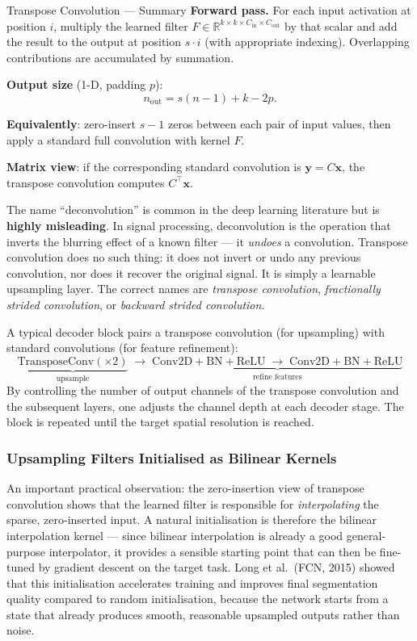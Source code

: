 \documentclass[11pt,a4paper]{article}
\begin{document}
\begin{defbox}{Transpose Convolution — Summary}
\textbf{Forward pass.} For each input activation at position $i$, multiply the learned filter $F \in \mathbb{R}^{k \times k \times C_\text{in} \times C_\text{out}}$ by that scalar and add the result to the output at position $s \cdot i$ (with appropriate indexing). Overlapping contributions are accumulated by summation.

\textbf{Output size} (1-D, padding $p$):
\[
  n_\text{out} = s(n-1) + k - 2p.
\]

\textbf{Equivalently}: zero-insert $s-1$ zeros between each pair of input values, then apply a standard full convolution with kernel $F$.

\textbf{Matrix view}: if the corresponding standard convolution is $\mathbf{y}=C\mathbf{x}$, the transpose convolution computes $C^\top\mathbf{x}$.
\end{defbox}

\begin{notebox}
The name ``deconvolution'' is common in the deep learning literature but is \textbf{highly misleading}. In signal processing, deconvolution is the operation that inverts the blurring effect of a known filter — it \emph{undoes} a convolution. Transpose convolution does no such thing: it does not invert or undo any previous convolution, nor does it recover the original signal. It is simply a learnable upsampling layer. The correct names are \emph{transpose convolution}, \emph{fractionally strided convolution}, or \emph{backward strided convolution}.
\end{notebox}

A typical decoder block pairs a transpose convolution (for upsampling) with standard convolutions (for feature refinement):
\[
  \underbrace{\text{TransposeConv}({\times}2)}_{\text{upsample}} \;\to\; \underbrace{\text{Conv2D} + \text{BN} + \text{ReLU} \;\to\; \text{Conv2D} + \text{BN} + \text{ReLU}}_{\text{refine features}}
\]
By controlling the number of output channels of the transpose convolution and the subsequent layers, one adjusts the channel depth at each decoder stage. The block is repeated until the target spatial resolution is reached.

\subsubsection{Upsampling Filters Initialised as Bilinear Kernels}

An important practical observation: the zero-insertion view of transpose convolution shows that the learned filter is responsible for \emph{interpolating} the sparse, zero-inserted input. A natural initialisation is therefore the bilinear interpolation kernel — since bilinear interpolation is already a good general-purpose interpolator, it provides a sensible starting point that can then be fine-tuned by gradient descent on the target task. Long et al.\ (FCN, 2015) showed that this initialisation accelerates training and improves final segmentation quality compared to random initialisation, because the network starts from a state that already produces smooth, reasonable upsampled outputs rather than noise.
\end{document}

